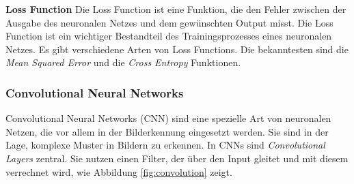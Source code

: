 \documentclass[11pt,a4paper]{article}
\begin{document}
\noindent \newline \textbf{Loss Function} \newline
Die Loss Function ist eine Funktion, die den Fehler zwischen der Ausgabe des neuronalen Netzes und
dem gewünschten Output misst. Die Loss Function ist ein wichtiger Bestandteil des Trainingsprozesses
eines neuronalen Netzes. Es gibt verschiedene Arten von Loss Functions. Die bekanntesten sind die
\textit{Mean Squared Error} und die \textit{Cross Entropy} Funktionen.


\subsubsection{Convolutional Neural Networks}
Convolutional Neural Networks (CNN) sind eine spezielle Art von neuronalen Netzen, die vor allem
in der Bilderkennung eingesetzt werden. Sie sind in der Lage, komplexe Muster in Bildern zu
erkennen. In CNNs sind \textit{Convolutional Layers} zentral. Sie nutzen einen Filter, der über den
Input gleitet und mit diesem verrechnet wird, wie Abbildung \ref{fig:convolution} zeigt.
\end{document}
